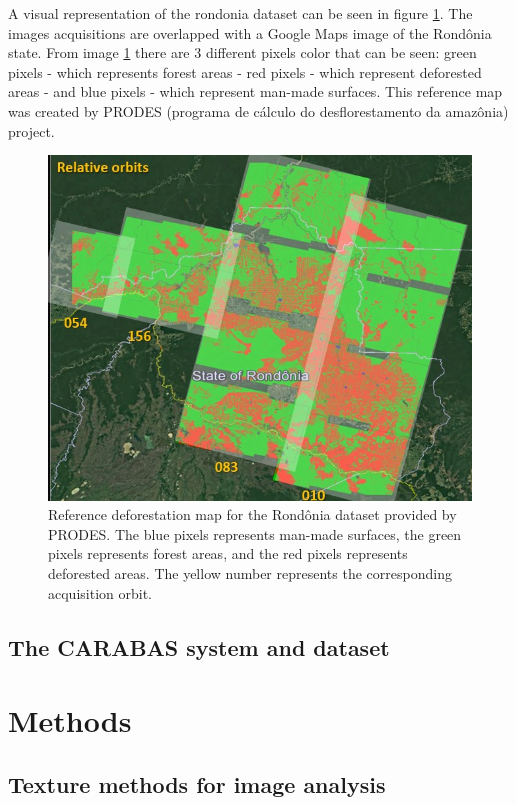 A visual representation of the rondonia dataset can be seen in figure \ref{fig:rondoniadataset}. The images acquisitions are overlapped with a Google Maps image of the Rondônia state. From image \ref{fig:rondoniadataset} there are 3 different pixels color that can be seen: green pixels - which represents forest areas - red pixels - which represent deforested areas - and blue pixels - which represent man-made surfaces. This reference map was created by PRODES (programa de cálculo do desflorestamento da amazônia) project.

\begin{figure}[h]
    \centering
    \includegraphics[width=\linewidth]{Cap2-Methods/rondonia_dataset.jpg}
    \caption{Reference deforestation map for the Rondônia dataset provided by PRODES. The blue pixels represents man-made surfaces, the green pixels represents forest areas, and the red pixels represents deforested areas. The yellow number represents the corresponding acquisition orbit.}
    \label{fig:rondoniadataset}
\end{figure}{}

\subsection{The CARABAS system and dataset}

\section{Methods}
\subsection{Texture methods for image analysis}
